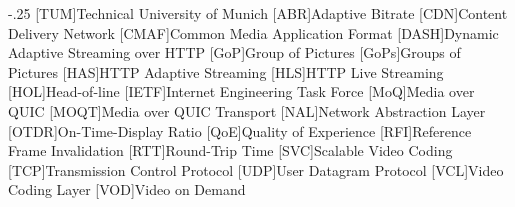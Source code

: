 \documentclass[headsepline,footsepline,footinclude=false,oneside,fontsize=11pt,paper=a4,listof=totoc,bibliography=totoc]{scrbook} %
\begin{document}


\frontmatter{}





\tableofcontents{}

\mainmatter{}






% 


\appendix{}


\begin{acronym}
	\itemsep-.25\baselineskip
	[TUM]{Technical University of Munich}
    [ABR]{Adaptive Bitrate}
	[CDN]{Content Delivery Network}
	[CMAF]{Common Media Application Format}
	[DASH]{Dynamic Adaptive Streaming over HTTP}
	[GoP]{Group of Pictures}
	[GoPs]{Groups of Pictures}
	[HAS]{HTTP Adaptive Streaming}
	[HLS]{HTTP Live Streaming}
	[HOL]{Head-of-line}
	[IETF]{Internet Engineering Task Force}
	[MoQ]{Media over QUIC}
	[MOQT]{Media over QUIC Transport}
	[NAL]{Network Abstraction Layer}
	[OTDR]{On-Time-Display Ratio}
	[QoE]{Quality of Experience}
	[RFI]{Reference Frame Invalidation}
	[RTT]{Round-Trip Time}
	[SVC]{Scalable Video Coding}
	[TCP]{Transmission Control Protocol}
	[UDP]{User Datagram Protocol}
	[VCL]{Video Coding Layer}
	[VOD]{Video on Demand}
\end{acronym}

\listoffigures{}
\printbibliography{}
\end{document}
